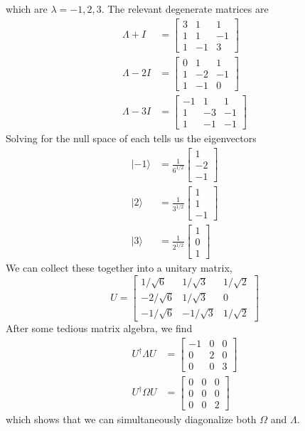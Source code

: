 \documentclass[../principles-of-quantum-mechanics.tex]{subfiles}
\begin{document}
\begin{questions}
\begin{solution}
	which are $\lambda={-1}, 2, 3$. The relevant degenerate matrices are
	\begin{align*}
		\Lambda + I &= \begin{bmatrix}
			3 & 1 & 1 \\ 1 & 1 & -1 \\ 1 & -1 & 3
		\end{bmatrix} \\
		\Lambda - 2I &= \begin{bmatrix}
			0 & 1 & 1 \\ 1 & -2 & -1 \\ 1 & -1 & 0
		\end{bmatrix} \\
		\Lambda - 3I &= \begin{bmatrix}
			-1 & 1 & 1 \\ 1 & -3 & -1 \\ 1 & -1 & -1
		\end{bmatrix}
	\end{align*}
	Solving for the null space of each tells us the eigenvectors
	\begin{align*}
		|{-1}\rangle &= \frac{1}{6^{1/2}}\begin{bmatrix}1 \\ -2 \\ -1\end{bmatrix} \qquad \\
		|2\rangle &= \frac{1}{3^{1/2}}\begin{bmatrix}1 \\ 1 \\ {-1}\end{bmatrix} \\
		|3\rangle &= \frac{1}{2^{1/2}}\begin{bmatrix}1 \\ 0 \\ 1\end{bmatrix}
	\end{align*}
	We can collect these together into a unitary matrix,
	\[
		U = \begin{bmatrix}
		1/\sqrt{6} & 1/\sqrt{3} & 1/\sqrt{2} \\
		-2/\sqrt{6} & 1/\sqrt{3} & 0 \\
		-1/\sqrt{6} & -1/\sqrt{3} & 1/\sqrt{2}
		\end{bmatrix}
	\]
	After some tedious matrix algebra, we find
	\begin{align*}
		U^\dagger\Lambda{U} &= \begin{bmatrix}
			-1 & 0 & 0 \\ 0 & 2 & 0 \\ 0 & 0 & 3
		\end{bmatrix} \\
		U^\dagger\Omega{U} &= \begin{bmatrix}
			0 & 0 & 0 \\ 0 & 0 & 0 \\ 0 & 0 & 2
		\end{bmatrix}
	\end{align*}
	which shows that we can simultaneously diagonalize both $\Omega$ and $\Lambda$.
\end{solution}


\end{questions}
\end{document}
